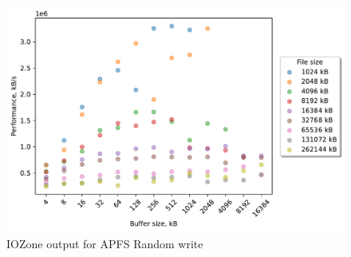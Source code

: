 \begin{figure}[!htb]
	\label{fig:bench_apfs_rnd_write}
	\begin{center}
		\includegraphics[width=1.0\textwidth]{figures.nosync/benchmarking/local/Random write.pdf}
	\end{center}
	\caption{IOZone output for \gls{APFS} Random write}
\end{figure}